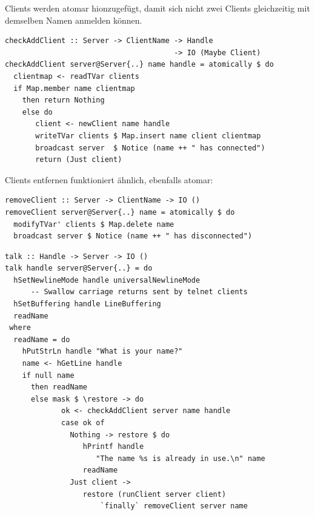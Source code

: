 \documentclass{beamer}
\begin{document}

\begin{frame}[fragile]

Clients werden atomar hionzugefügt, damit sich nicht zwei Clients gleichzeitig
mit demselben Namen anmelden können.

\begin{verbatim}
checkAddClient :: Server -> ClientName -> Handle
                                       -> IO (Maybe Client)
checkAddClient server@Server{..} name handle = atomically $ do
  clientmap <- readTVar clients
  if Map.member name clientmap
    then return Nothing
    else do 
       client <- newClient name handle
       writeTVar clients $ Map.insert name client clientmap
       broadcast server  $ Notice (name ++ " has connected")
       return (Just client)
\end{verbatim}
\end{frame}


\begin{frame}[fragile]

Clients entfernen funktioniert ähnlich, ebenfalls atomar:

\begin{verbatim}
removeClient :: Server -> ClientName -> IO ()
removeClient server@Server{..} name = atomically $ do
  modifyTVar' clients $ Map.delete name
  broadcast server $ Notice (name ++ " has disconnected")
\end{verbatim}
\end{frame}


\begin{frame}[fragile]

\begin{verbatim}
talk :: Handle -> Server -> IO ()
talk handle server@Server{..} = do
  hSetNewlineMode handle universalNewlineMode
      -- Swallow carriage returns sent by telnet clients
  hSetBuffering handle LineBuffering
  readName
 where
  readName = do
    hPutStrLn handle "What is your name?"
    name <- hGetLine handle
    if null name
      then readName
      else mask $ \restore -> do
             ok <- checkAddClient server name handle
             case ok of
               Nothing -> restore $ do
                  hPrintf handle
                     "The name %s is already in use.\n" name
                  readName
               Just client ->
                  restore (runClient server client)
                      `finally` removeClient server name
\end{verbatim}

\end{frame}
\end{document}
